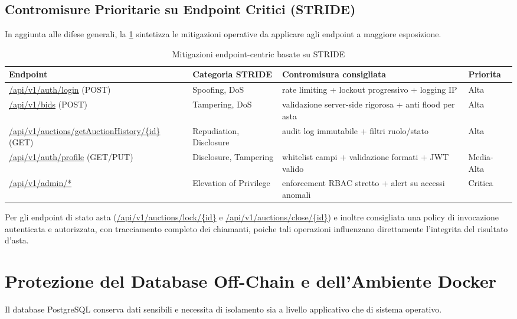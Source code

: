 \subsection*{Contromisure Prioritarie su Endpoint Critici (STRIDE)}
In aggiunta alle difese generali, la \cref{tab:stride-mitigations} sintetizza le mitigazioni operative da applicare agli endpoint a maggiore esposizione.

\begin{table}[!htbp]
    \centering
    \small
    \begin{tabular}{@{}p{}p{}p{}p{}@{}}
        \toprule
        \textbf{Endpoint} & \textbf{Categoria STRIDE} & \textbf{Contromisura consigliata} & \textbf{Priorita} \\
        \midrule
        \url{/api/v1/auth/login} (POST) & Spoofing, DoS & rate limiting + lockout progressivo + logging IP & Alta \\
        \url{/api/v1/bids} (POST) & Tampering, DoS & validazione server-side rigorosa + anti flood per asta & Alta \\
        \url{/api/v1/auctions/getAuctionHistory/\{id\}} (GET) & Repudiation, Disclosure & audit log immutabile + filtri ruolo/stato & Alta \\
        \url{/api/v1/auth/profile} (GET/PUT) & Disclosure, Tampering & whitelist campi + validazione formati + JWT valido & Media-Alta \\
        \url{/api/v1/admin/*} & Elevation of Privilege & enforcement RBAC stretto + alert su accessi anomali & Critica \\
        \bottomrule
    \end{tabular}
    \caption{Mitigazioni endpoint-centric basate su STRIDE}
    \label{tab:stride-mitigations}
\end{table}

Per gli endpoint di stato asta (\url{/api/v1/auctions/lock/\{id\}} e \url{/api/v1/auctions/close/\{id\}}) e inoltre consigliata una policy di invocazione autenticata e autorizzata, con tracciamento completo dei chiamanti, poiche tali operazioni influenzano direttamente l'integrita del risultato d'asta.

\section{Protezione del Database Off-Chain e dell'Ambiente Docker}

Il database PostgreSQL conserva dati sensibili e necessita di isolamento sia a livello applicativo che di sistema operativo.

